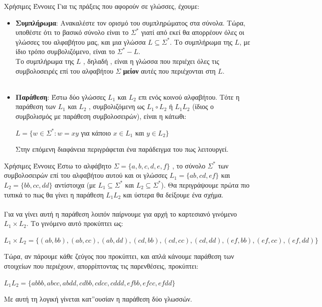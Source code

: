 \documentclass[size=14pt, paper=smartboard, style=fyma, mode=present]{powerdot}
\begin{document}
\begin{slide}[toc=]{Χρήσιμες Έννοιες}
	Για τις πράξεις που αφορούν σε γλώσσες, έχουμε:
	\begin{itemize}
		\item \textbf{Συμπλήρωμα}: Ανακαλέστε τον ορισμό του συμπληρώματος στα σύνολα. Τώρα, υποθέστε ότι το βασικό σύνολο είναι το $\Sigma^*$ γιατί από εκεί θα απορρέουν όλες οι γλώσσες του αλφαβήτου μας, και μια γλώσσα $L \subseteq \Sigma^*$. Το συμπλήρωμα της $L$, με ίδιο τρόπο συμβολιζόμενο, είναι το $\Sigma^* - L$. \\
		Το συμπλήρωμα της $L$ , δηλαδή , είναι η γλώσσα που περιέχει όλες τις συμβολοσειρές επί του αλφαβήτου $\Sigma$ \textbf{μείον} αυτές που περιέχονται στη $L$.
		\pause
		\\~\\
		\item \textbf{Παράθεση}: Έστω δύο γλώσσες $L_1$ και $L_2$ επι ενός κοινού αλφαβήτου. Τότε η παράθεση των $L_1$ και $L_2$ , συμβολιζόμενη ως $L_1 \circ L_2$ ή $L_1L_2$ (ίδιος ο συμβολισμός με παράθεση συμβολοσειρών), είναι η κάτωθι:\\
		\begin{center}
			$L=\{w \in \Sigma^*: w = xy $ για κάποιο $x\in L_1$ και $y\in L_2\}$  
		\end{center}
		Στην επόμενη διαφάνεια περιγράφεται ένα παράδειγμα του πως λειτουργεί.
	\end{itemize}
\end{slide}	
\begin{slide}[toc=]{Χρήσιμες Έννοιες}
	Έστω το αλφάβητο $\Sigma = \{a,b,c,d,e,f\}$ , το σύνολο $\Sigma^*$ των συμβολοσειρών επί του αλφαβήτου αυτού και οι γλώσσες $L_1 = \{ab,cd,ef\}$ και $L_2 = \{bb,cc,dd\}$ αντίστοιχα (με $L_1 \subseteq \Sigma^*$ και $L_2 \subseteq \Sigma^*$). Θα περιγράψουμε πρώτα πιο τυπικά το πως θα γίνει η παράθεση $L_1L_2$ και ύστερα θα δείξουμε ένα σχήμα. \pause
	\\~\\
	Για να γίνει αυτή η παράθεση λοιπόν παίρνουμε για αρχή το καρτεσιανό γινόμενο $L_1 \times L_2$. Το γινόμενο αυτό προκύπτει ως: \pause
	\begin{center}
		$L_1 \times L_2 = \{(ab,bb),(ab,cc),(ab,dd),(cd,bb),(cd,cc),(cd,dd),
		(ef,bb),(ef,cc),(ef,dd)\}$
	\end{center} \pause
	Τώρα, αν πάρουμε κάθε ζεύγος που προκύπτει, και απλά κάνουμε παράθεση των στοιχείων που περιέχουν, απορρίπτοντας τις παρενθέσεις, προκύπτει:
		\begin{center}
		$L_1L_2 = \{abbb,abcc,abdd,cdbb,cdcc,cddd,
		efbb,efcc,efdd\}$
	\end{center} \pause
	Με αυτή τη λογική γίνεται κατ''ουσίαν η παράθεση δύο γλωσσών.
\end{slide}
\end{document}

